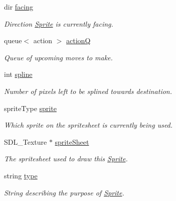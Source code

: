 \begin{DoxyCompactItemize}
\item 
dir \hyperlink{class_sprite_a40357a4e61f454decf1970929e9d2d0c}{facing}\hypertarget{class_sprite_a40357a4e61f454decf1970929e9d2d0c}{}\label{class_sprite_a40357a4e61f454decf1970929e9d2d0c}

\begin{DoxyCompactList}\small\item\em Direction \hyperlink{class_sprite}{Sprite} is currently facing. \end{DoxyCompactList}\item 
queue$<$ action $>$ \hyperlink{class_sprite_a8b183d19c55c1f0928075bd2cb926f68}{actionQ}\hypertarget{class_sprite_a8b183d19c55c1f0928075bd2cb926f68}{}\label{class_sprite_a8b183d19c55c1f0928075bd2cb926f68}

\begin{DoxyCompactList}\small\item\em Queue of upcoming moves to make. \end{DoxyCompactList}\item 
int \hyperlink{class_sprite_aa3a18aaf97a12edfced1b31f2323ae01}{spline}\hypertarget{class_sprite_aa3a18aaf97a12edfced1b31f2323ae01}{}\label{class_sprite_aa3a18aaf97a12edfced1b31f2323ae01}

\begin{DoxyCompactList}\small\item\em Number of pixels left to be splined towards destination. \end{DoxyCompactList}\item 
sprite\+Type \hyperlink{class_sprite_afbd06de3c7cace1c741bbb609abfa119}{sprite}\hypertarget{class_sprite_afbd06de3c7cace1c741bbb609abfa119}{}\label{class_sprite_afbd06de3c7cace1c741bbb609abfa119}

\begin{DoxyCompactList}\small\item\em Which sprite on the spritesheet is currently being used. \end{DoxyCompactList}\item 
S\+D\+L\+\_\+\+Texture $\ast$ \hyperlink{class_sprite_aec7102885a3ca3fdd5124f8677135013}{sprite\+Sheet}\hypertarget{class_sprite_aec7102885a3ca3fdd5124f8677135013}{}\label{class_sprite_aec7102885a3ca3fdd5124f8677135013}

\begin{DoxyCompactList}\small\item\em The spritesheet used to draw this \hyperlink{class_sprite}{Sprite}. \end{DoxyCompactList}\item 
string \hyperlink{class_sprite_af4ab6cfa8155326b6d8af31f943514f2}{type}\hypertarget{class_sprite_af4ab6cfa8155326b6d8af31f943514f2}{}\label{class_sprite_af4ab6cfa8155326b6d8af31f943514f2}

\begin{DoxyCompactList}\small\item\em String describing the purpose of \hyperlink{class_sprite}{Sprite}. \end{DoxyCompactList}\end{DoxyCompactItemize}


